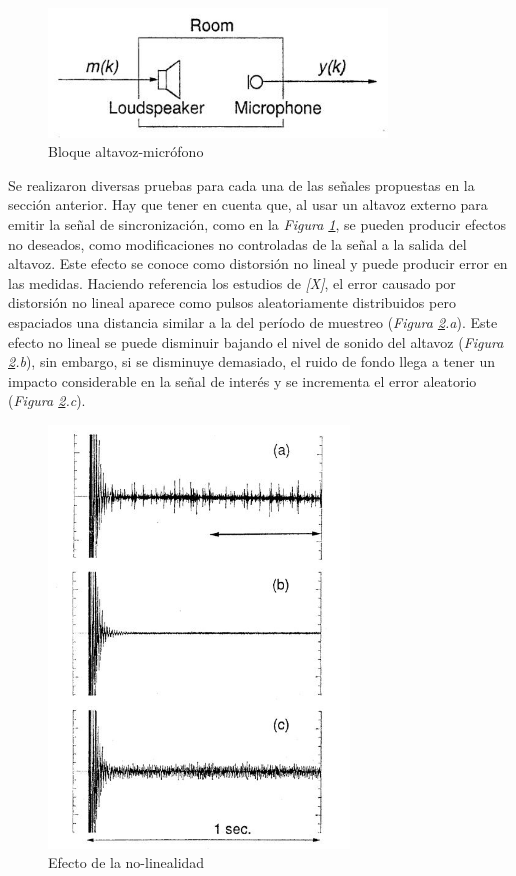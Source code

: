 \documentclass[a4paper,11pt]{book}
\begin{document}
\begin{figure}[hbtp]
\centering
\includegraphics[width = 9cm]{FIGURAS/altavoz-micro.JPG}
\caption{Bloque altavoz-micrófono}
\label{entorno}
\end{figure}


Se realizaron diversas pruebas para cada una de las señales propuestas en la sección anterior. Hay que tener en cuenta que, al usar un altavoz externo para emitir la señal de sincronización, como en la \textit{Figura \ref{entorno}}, se pueden producir efectos no deseados, como modificaciones no controladas de la señal a la salida del altavoz. Este efecto se conoce como distorsión no lineal y puede producir error en las medidas. Haciendo referencia los estudios de \textit{[X]}, el error causado por distorsión no lineal aparece como pulsos aleatoriamente distribuidos pero espaciados una distancia similar a la del período de muestreo (\textit{Figura \ref{noLineal}.a}). Este efecto no lineal se puede disminuir bajando el nivel de sonido del altavoz (\textit{Figura \ref{noLineal}.b}), sin embargo, si se disminuye demasiado, el ruido de fondo llega a tener un impacto considerable en la señal de interés y se incrementa el error aleatorio (\textit{Figura \ref{noLineal}.c}).

\begin{figure}[hbtp]
\centering
\includegraphics[width = 8cm]{FIGURAS/nonlinear.JPG}
\caption{Efecto de la no-linealidad}
\label{noLineal}
\end{figure}
\end{document}

